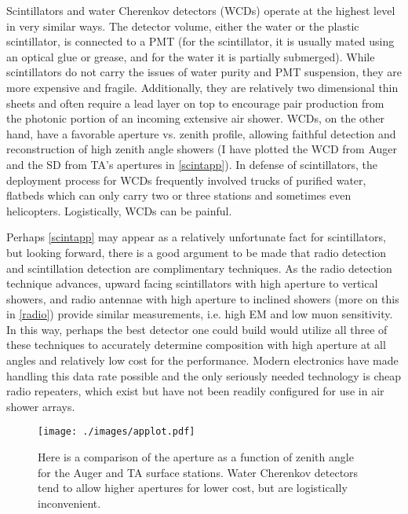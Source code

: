 Scintillators and water Cherenkov detectors (WCDs) operate at the highest level in very similar ways. The detector volume, either the water or the plastic scintillator, is connected to a PMT (for the scintillator, it is usually mated using an optical glue or grease, and for the water it is partially submerged). While scintillators do not carry the issues of water purity and PMT suspension, they are more expensive and fragile. Additionally, they are relatively two dimensional thin sheets and often require a lead layer on top to encourage pair production from the photonic portion of an incoming extensive air shower. WCDs, on the other hand, have a favorable aperture vs. zenith profile, allowing faithful detection and reconstruction of high zenith angle showers (I have plotted the WCD from Auger and the SD from TA's apertures in \autoref{scintapp}). In defense of scintillators, the deployment process for WCDs frequently involved trucks of purified water, flatbeds which can only carry two or three stations and sometimes even helicopters. Logistically, WCDs can be painful.

Perhaps \autoref{scintapp} may appear as a relatively unfortunate fact for scintillators, but looking forward, there is a good argument to be made that radio detection and scintillation detection are complimentary techniques. As the radio detection technique advances, upward facing scintillators with high aperture to vertical showers, and radio antennae with high aperture to inclined showers (more on this in \autoref{radio}) provide similar measurements, i.e. high EM and low muon sensitivity. In this way, perhaps the best detector one could build would utilize all three of these techniques to accurately determine composition with high aperture at all angles and relatively low cost for the performance. Modern electronics have made handling this data rate possible and the only seriously needed technology is cheap radio repeaters, which exist but have not been readily configured for use in air shower arrays.

\begin{figure}[h!]
\begin{center}
\texttt{[image: ./images/applot.pdf]}
\caption[Auger and TA Surface Detector Apertures]{Here is a comparison of the aperture as a function of zenith angle for the Auger and TA surface stations. Water Cherenkov detectors tend to allow higher apertures for lower cost, but are logistically inconvenient.}
\label{scintapp}
\end{center}
\end{figure}

